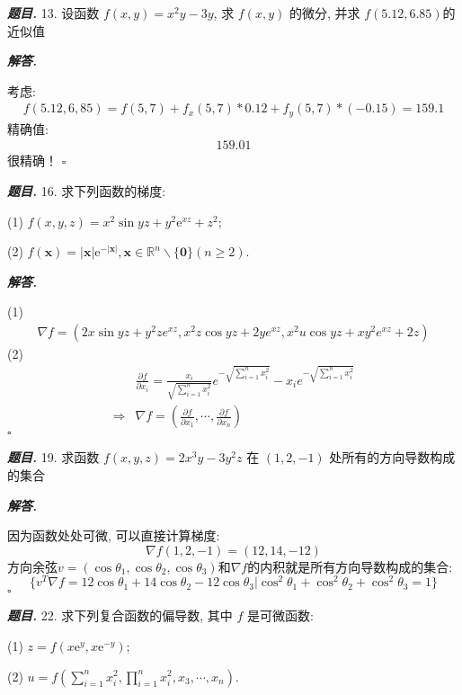 \documentclass[10pt, a4paper, oneside]{ctexart}
\newenvironment{problem}{\begin{framed}\par\noindent\textbf{\textit{题目. }}}{\end{framed}\par}
\newenvironment{solution}{%
  \par\noindent\textbf{\textit{解答. }}\ignorespaces
}{%
  \hfill\ensuremath{\square}\par %
}
\begin{document}
\begin{problem}
13. 设函数 $f(x, y)=x^2 y-3 y$, 求 $f(x, y)$ 的微分, 并求 $f(5.12,6.85)$的近似值
\end{problem}
\begin{solution}
考虑:
\begin{align*}
    f(5.12,6,85)=f(5,7)+f_x(5,7)*0.12+f_y(5,7)*(-0.15)=159.1
\end{align*}
精确值:
\begin{align*}
    159.01
\end{align*}
很精确！
\end{solution}

\begin{problem}
16. 求下列函数的梯度:

(1) $f(x, y, z)=x^2 \sin y z+y^2 \mathrm{e}^{x z}+z^2$;

(2) $f(\boldsymbol{x})=|\boldsymbol{x}| \mathrm{e}^{-|\boldsymbol{x}|}, \boldsymbol{x} \in \mathbb{R}^n \backslash\{\boldsymbol{0}\}(n \geqslant 2)$.
\end{problem}
\begin{solution}
(1) 
\begin{align*}
    \nabla f = (2x\sin yz+y^2ze^{xz},x^2z\cos yz+2ye^{xz},x^2u\cos yz+xy^2e^{xz}+2z)
\end{align*}
(2)
\begin{align*}
    &\frac{\partial f}{\partial x_i}=\frac{x_i}{\sqrt{\sum_{i=1}^n x_i^2}}e^{-\sqrt{\sum_{i=1}^n x_i^2}}-x_ie^{-\sqrt{\sum_{i=1}^n x_i^2}}\\
    \Rightarrow&\nabla f=(\frac{\partial f}{\partial x_1},\cdots,\frac{\partial f}{\partial x_n})
\end{align*}
\end{solution}

\begin{problem}
19. 求函数 $f(x, y, z)=2 x^3 y-3 y^2 z$ 在 $(1,2,-1)$ 处所有的方向导数构成的集合
\end{problem}

\begin{solution}
因为函数处处可微, 可以直接计算梯度:
$$\nabla f(1,2,-1)=(12,14,-12)$$
方向余弦$v=(\cos \theta_1,\cos \theta_2,\cos \theta_3)$和$\nabla f$的内积就是所有方向导数构成的集合:
$$\{v^T\nabla f=12\cos \theta_1+14\cos \theta_2-12\cos \theta_3|\cos^2 \theta_1+\cos^2\theta_2+\cos^2 \theta_3=1\}$$
\end{solution}

\begin{problem}
22. 求下列复合函数的偏导数, 其中 $f$ 是可微函数:

(1) $z=f\left(x \mathrm{e}^y, x \mathrm{e}^{-y}\right)$;

(2) $u=f\left(\sum_{i=1}^n x_i^2, \prod_{i=1}^n x_i^2, x_3, \cdots, x_n\right)$.
\end{problem}
\end{document}
